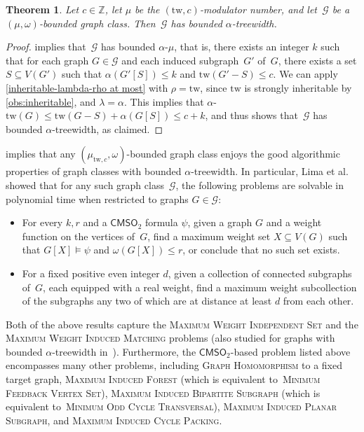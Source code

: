 \documentclass[11pt]{article}
\newcommand{\tw}{\mathrm{tw}}
\newcommand{\twcm}{\mu_{\tw,c}}
\theoremstyle{plain}
\newtheorem{theorem}{Theorem}[section]
\theoremstyle{definition}
\theoremstyle{remark}
\numberwithin{equation}{section}
\begin{document}
\begin{theorem}\label{thm:tw-modulator-omega-bdd}
Let $c \in \mathbb{Z}$, let $\mu$ be the $(\tw,c)$-modulator number, and let~$\mathcal{G}$ be a $(\mu,\omega)$-bounded graph class.
Then~$\mathcal{G}$ has bounded $\alpha$-treewidth.
\end{theorem}

\begin{proof}
 implies that~$\mathcal{G}$ has bounded $\alpha$-$\mu$, that is, there exists an integer $k$ such that for each graph $G\in \mathcal{G}$ and each induced subgraph~$G'$ of~$G$, there exists a set $S\subseteq V(G')$ such that $\alpha(G'[S])\le k$ and $\tw(G'-S)\le c$.
We can apply \cref{inheritable-lambda-rho at most} with $\rho = \tw$, since $\tw$ is strongly inheritable by \cref{obs:inheritable}, and $\lambda = \alpha$.
This implies that $\alpha$-$\tw(G) \leq \tw(G - S) + \alpha(G[S]) \leq c+k$, and thus shows that~$\mathcal{G}$ has bounded $\alpha$-treewidth, as claimed.
\end{proof}

 implies that any $(\twcm,\omega)$-bounded graph class enjoys the good algorithmic properties of graph classes with bounded $\alpha$-treewidth.
In particular, Lima et al.~\cite{LMMORS24} showed that for any such graph class~$\mathcal{G}$, the following problems are solvable in polynomial time when restricted to graphs $G\in \mathcal{G}$:
\begin{itemize}
    \item For every $k,r$ and a $\mathsf{CMSO}_2$ formula $\psi$, given a graph $G$ and a weight function on the vertices of~$G$, find a maximum weight set $X \subseteq V(G)$ such that $G[X] \models \psi$ and $\omega(G[X]) \leq r$, or conclude that no such set exists.
    \item  For a fixed positive even integer $d$, given a collection of connected subgraphs of~$G$, each equipped with a real weight, find a maximum weight subcollection of the subgraphs any two of which are at  distance at least $d$ from each other.
\end{itemize}
Both of the above results capture the \textsc{Maximum Weight Independent Set} and the \textsc{Maximum Weight Induced Matching} problems (also studied for graphs with bounded $\alpha$-treewidth in~\cite{dallard2022firstpaper,MR3775804}).
Furthermore, the $\mathsf{CMSO}_2$-based problem listed above encompasses many other problems, including \textsc{Graph Homomorphism} to a fixed target graph, \textsc{Maximum Induced Forest} (which is equivalent to~\textsc{Minimum Feedback Vertex Set}), \textsc{Maximum Induced Bipartite Subgraph} (which is equivalent to~\textsc{Minimum Odd Cycle Transversal}), \textsc{Maximum Induced Planar Subgraph}, and \textsc{Maximum Induced Cycle Packing}.
\end{document}
